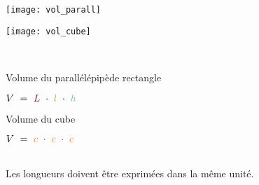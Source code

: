  \begin{aconnaitre}
   \begin{minipage}[t]{0.48\linewidth}
  \begin{center} \texttt{[image: vol\_parall]} \end{center}
  \end{minipage} \hfill%
   \begin{minipage}[t]{0.48\linewidth}    
  \begin{center}  \texttt{[image: vol\_cube]} \end{center}
   \end{minipage} \\
   \begin{minipage}[t]{0.48\linewidth}
  \begin{center} Volume du parallélépipède rectangle \end{center}
  \begin{center} $V = \textcolor{C1}{L} \cdot \textcolor{H1}{l} \cdot \textcolor{U1}{h}$ \end{center}
  \end{minipage} \hfill%
   \begin{minipage}[t]{0.48\linewidth}  
  \begin{center} Volume du cube \end{center}
  \begin{center} $V = \textcolor{J1}{c} \cdot \textcolor{J1}{c} \cdot  \textcolor{J1}{c}$ \end{center}
   \end{minipage} \\[1em]
Les longueurs doivent être exprimées dans la même unité.
\end{aconnaitre}

